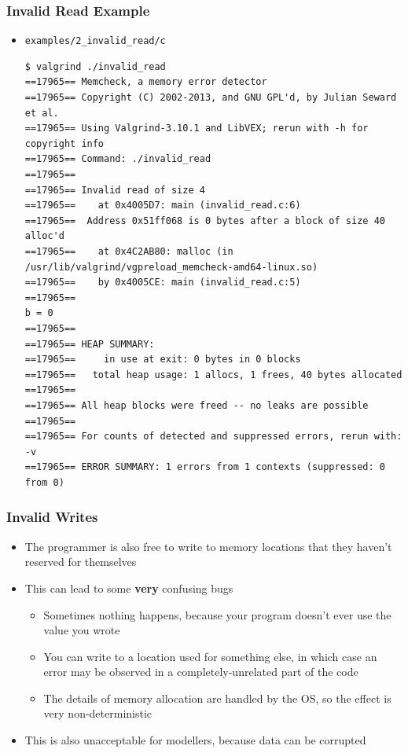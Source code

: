 \documentclass{beamer}
\begin{document}
\begin{frame}[fragile]
  \frametitle{Invalid Read Example}
  \begin{itemize}
    \item \texttt{examples/2\_invalid\_read/c}
      \begin{lstlisting}
$ valgrind ./invalid_read
==17965== Memcheck, a memory error detector
==17965== Copyright (C) 2002-2013, and GNU GPL'd, by Julian Seward et al.
==17965== Using Valgrind-3.10.1 and LibVEX; rerun with -h for copyright info
==17965== Command: ./invalid_read
==17965==
==17965== Invalid read of size 4
==17965==    at 0x4005D7: main (invalid_read.c:6)
==17965==  Address 0x51ff068 is 0 bytes after a block of size 40 alloc'd
==17965==    at 0x4C2AB80: malloc (in /usr/lib/valgrind/vgpreload_memcheck-amd64-linux.so)
==17965==    by 0x4005CE: main (invalid_read.c:5)
==17965==
b = 0
==17965==
==17965== HEAP SUMMARY:
==17965==     in use at exit: 0 bytes in 0 blocks
==17965==   total heap usage: 1 allocs, 1 frees, 40 bytes allocated
==17965==
==17965== All heap blocks were freed -- no leaks are possible
==17965==
==17965== For counts of detected and suppressed errors, rerun with: -v
==17965== ERROR SUMMARY: 1 errors from 1 contexts (suppressed: 0 from 0)  
      \end{lstlisting}
  \end{itemize}
\end{frame}

\begin{frame}[fragile]
  \frametitle{Invalid Writes}
  \begin{itemize}
    \item The programmer is also free to write to memory locations that they haven't reserved for themselves
    \item This can lead to some {\bf very} confusing bugs
      \begin{itemize}
        \item Sometimes nothing happens, because your program doesn't ever use the value you wrote
          \item You can write to a location used for something else, in which case an error may be observed in a completely-unrelated part of the code
            \item The details of memory allocation are handled by the OS, so the effect is very non-deterministic
      \end{itemize}
      \item This is also unacceptable for modellers, because data can be corrupted
  \end{itemize}
\end{frame}
\end{document}
